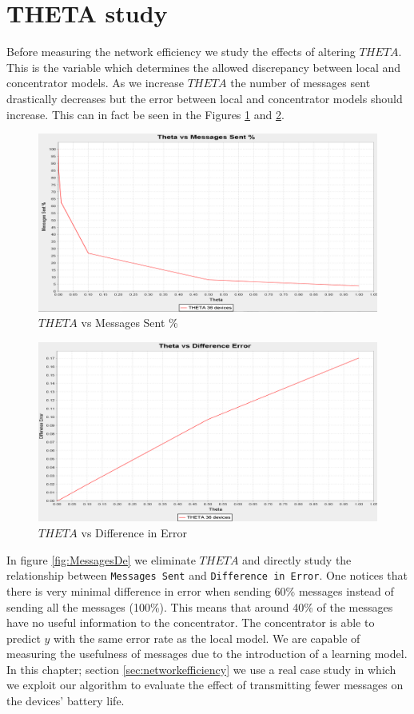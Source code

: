 \documentclass{mproj}
\begin{document}
\section{THETA study}
Before measuring the network efficiency we study the effects of altering $THETA$. This is the variable which determines the allowed discrepancy between local and concentrator models. As we increase $THETA$ the number of messages sent drastically decreases but the error between local and concentrator models should increase. This can in fact be seen in the Figures \ref{fig:ThetaMessages} and \ref{fig:ThetaDE}.

\begin{figure}[H]
\caption{$THETA$ vs Messages Sent \%}
\label{fig:ThetaMessages}
\centerline{\includegraphics[scale=0.4]{ThetaMessages}}
\end{figure}

\begin{figure}[H]
\caption{$THETA$ vs Difference in Error}
\label{fig:ThetaDE}
\centerline{\includegraphics[scale=0.4]{ThetaDE}}
\end{figure}

In figure \ref{fig:MessagesDe} we eliminate $THETA$ and directly study the relationship between \texttt{Messages Sent} and \texttt{Difference in Error}. One notices that there is very minimal difference in error when sending 60\% messages instead of sending all the messages (100\%). This means that around 40\% of the messages have no useful information to the concentrator. The concentrator is able to predict $y$ with the same error rate as the local model. We are capable of measuring the usefulness of messages due to the introduction of a learning model. In this chapter; section \ref{sec:networkefficiency} we use a real case study in which we exploit our algorithm to evaluate the effect of transmitting fewer messages on the devices' battery life.
\end{document}
